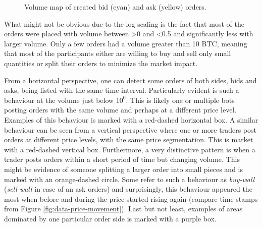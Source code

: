 \begin{figure}[H]
    \centering
    \caption{Volume map of created bid (cyan) and ask (yellow) orders.}
    \label{fig:data-volmap-crated}
\end{figure}

What might not be obvious due to the log scaling is the fact that most of the orders were placed with volume between >0 and <0.5 and significantly less with larger volume.
Only a few orders had a volume greater than 10 BTC, meaning that most of the participants either are willing to buy and sell only small quantities or split their orders to minimize the market impact.

From a horizontal perspective, one can detect some orders of both sides, bids and asks, being listed with the same time interval.
Particularly evident is such a behaviour at the volume just below $10^0$.
This is likely one or multiple bots posting orders with the same volume and perhaps at a different price level.
Examples of this behaviour is marked with a red-dashed horizontal box.
A similar behaviour can be seen from a vertical perspective where one or more traders post orders at different price levels, with the same price segmentation.
This is market with a red-dashed vertical box.
Furthermore, a very distinctive pattern is when a trader posts orders within a short period of time but changing volume.
This might be evidence of someone splitting a larger order into small pieces and is marked with an orange-dashed circle.
Some refer to such a behaviour as \textit{buy-wall} (\textit{sell-wall} in case of an ask orders) and surprisingly, this behaviour appeared the most when before and during the price started rising again (compare time stamps from Figure \ref{fig:data-price-movement}).
Last but not least, examples of areas dominated by one particular order side is marked with a purple box.

